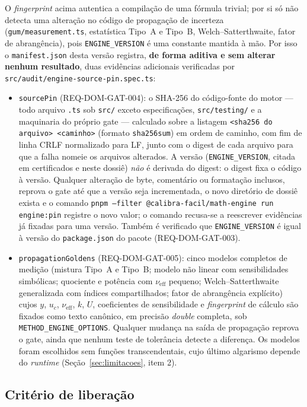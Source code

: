 \documentclass[11pt,a4paper]{article}
\begin{document}
O \emph{fingerprint} acima autentica a compilação de uma fórmula trivial; por si só não detecta uma alteração no código de propagação de incerteza (\texttt{gum/measurement.ts}, estatística Tipo~A e Tipo~B, Welch--Satterthwaite, fator de abrangência), pois \texttt{ENGINE\_VERSION} é uma constante mantida à mão. Por isso o \texttt{manifest.json} desta versão registra, \textbf{de forma aditiva e sem alterar nenhum resultado}, duas evidências adicionais verificadas por \texttt{src/audit/engine-source-pin.spec.ts}:
\begin{itemize}
  \item \texttt{sourcePin} (REQ-DOM-GAT-004): o SHA-256 do código-fonte do motor --- todo arquivo \texttt{.ts} sob \texttt{src/} exceto especificações, \texttt{src/testing/} e a maquinaria do próprio gate --- calculado sobre a listagem \texttt{<sha256 do arquivo>  <caminho>} (formato \texttt{sha256sum}) em ordem de caminho, com fim de linha CRLF normalizado para LF, junto com o digest de cada arquivo para que a falha nomeie os arquivos alterados. A versão (\texttt{ENGINE\_VERSION}, citada em certificados e neste dossiê) \emph{não} é derivada do digest: o digest fixa o código à versão. Qualquer alteração de byte, comentário ou formatação inclusos, reprova o gate até que a versão seja incrementada, o novo diretório de dossiê exista e o comando \texttt{pnpm --filter @calibra-facil/math-engine run engine:pin} registre o novo valor; o comando recusa-se a reescrever evidências já fixadas para uma versão. Também é verificado que \texttt{ENGINE\_VERSION} é igual à versão do \texttt{package.json} do pacote (REQ-DOM-GAT-003).
  \item \texttt{propagationGoldens} (REQ-DOM-GAT-005): cinco modelos completos de medição (mistura Tipo~A e Tipo~B; modelo não linear com sensibilidades simbólicas; quociente e potência com \(\nu_{\text{eff}}\) pequeno; Welch--Satterthwaite generalizada com índices compartilhados; fator de abrangência explícito) cujos \(y\), \(u_c\), \(\nu_{\text{eff}}\), \(k\), \(U\), coeficientes de sensibilidade e \emph{fingerprint} de cálculo são fixados como texto canônico, em precisão \emph{double} completa, sob \texttt{METHOD\_ENGINE\_OPTIONS}. Qualquer mudança na saída de propagação reprova o gate, ainda que nenhum teste de tolerância detecte a diferença. Os modelos foram escolhidos sem funções transcendentais, cujo último algarismo depende do \emph{runtime} (Seção~\ref{sec:limitacoes}, item 2).
\end{itemize}

\subsection{Critério de liberação}
\end{document}
